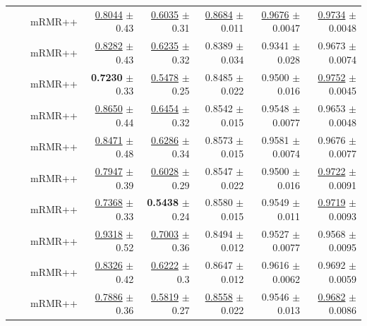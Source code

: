 \begin{longtable}{llp{}rrrrr}
 &  & mRMR++ & \underline{0.8044} {\scriptsize $\pm$ 0.43} & \underline{0.6035} {\scriptsize $\pm$ 0.31} & \underline{0.8684} {\scriptsize $\pm$ 0.011} & \underline{0.9676} {\scriptsize $\pm$ 0.0047} & \underline{0.9734} {\scriptsize $\pm$ 0.0048} \\
 &  & mRMR++ & \underline{0.8282} {\scriptsize $\pm$ 0.43} & \underline{0.6235} {\scriptsize $\pm$ 0.32} & 0.8389 {\scriptsize $\pm$ 0.034} & 0.9341 {\scriptsize $\pm$ 0.028} & 0.9673 {\scriptsize $\pm$ 0.0074} \\
 &  & mRMR++ & \textbf{0.7230} {\scriptsize $\pm$ 0.33} & \underline{0.5478} {\scriptsize $\pm$ 0.25} & 0.8485 {\scriptsize $\pm$ 0.022} & 0.9500 {\scriptsize $\pm$ 0.016} & \underline{0.9752} {\scriptsize $\pm$ 0.0045} \\
 &  & mRMR++ & \underline{0.8650} {\scriptsize $\pm$ 0.44} & \underline{0.6454} {\scriptsize $\pm$ 0.32} & 0.8542 {\scriptsize $\pm$ 0.015} & 0.9548 {\scriptsize $\pm$ 0.0077} & 0.9653 {\scriptsize $\pm$ 0.0048} \\
 &  & mRMR++ & \underline{0.8471} {\scriptsize $\pm$ 0.48} & \underline{0.6286} {\scriptsize $\pm$ 0.34} & 0.8573 {\scriptsize $\pm$ 0.015} & 0.9581 {\scriptsize $\pm$ 0.0074} & 0.9676 {\scriptsize $\pm$ 0.0077} \\
 &  & mRMR++ & \underline{0.7947} {\scriptsize $\pm$ 0.39} & \underline{0.6028} {\scriptsize $\pm$ 0.29} & 0.8547 {\scriptsize $\pm$ 0.022} & 0.9500 {\scriptsize $\pm$ 0.016} & \underline{0.9722} {\scriptsize $\pm$ 0.0091} \\
 &  & mRMR++ & \underline{0.7368} {\scriptsize $\pm$ 0.33} & \textbf{0.5438} {\scriptsize $\pm$ 0.24} & 0.8580 {\scriptsize $\pm$ 0.015} & 0.9549 {\scriptsize $\pm$ 0.011} & \underline{0.9719} {\scriptsize $\pm$ 0.0093} \\
 &  & mRMR++ & \underline{0.9318} {\scriptsize $\pm$ 0.52} & \underline{0.7003} {\scriptsize $\pm$ 0.36} & 0.8494 {\scriptsize $\pm$ 0.012} & 0.9527 {\scriptsize $\pm$ 0.0077} & 0.9568 {\scriptsize $\pm$ 0.0095} \\
 &  & mRMR++ & \underline{0.8326} {\scriptsize $\pm$ 0.42} & \underline{0.6222} {\scriptsize $\pm$ 0.3} & 0.8647 {\scriptsize $\pm$ 0.012} & 0.9616 {\scriptsize $\pm$ 0.0062} & 0.9692 {\scriptsize $\pm$ 0.0059} \\
 &  & mRMR++ & \underline{0.7886} {\scriptsize $\pm$ 0.36} & \underline{0.5819} {\scriptsize $\pm$ 0.27} & \underline{0.8558} {\scriptsize $\pm$ 0.022} & 0.9546 {\scriptsize $\pm$ 0.013} & \underline{0.9682} {\scriptsize $\pm$ 0.0086} \\

\end{longtable}
